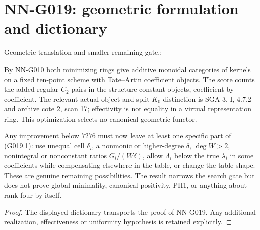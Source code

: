 \section{NN-G019: geometric formulation and dictionary}
\begin{geometricstatement}[NN-G019]
Geometric translation and smaller remaining gate.:

By NN-G010 both minimizing rings give additive monoidal
categories of kernels on a fixed ten-point scheme with
Tate--Artin coefficient objects. The score counts the added
regular $C_2$ pairs in the structure-constant objects,
coefficient by coefficient. The relevant actual-object and
split-$K_0$ distinction is SGA 3, I, 4.7.2 and archive cote 2,
scan 17; effectivity is not equality in a virtual representation
ring. This optimization selects no canonical geometric functor.

Any improvement below $7276$ must now leave at least one
specific part of (G019.1): use unequal cell $\delta_i$,
a nonmonic or higher-degree $\delta$, $\deg W>2$,
nonintegral or nonconstant ratios $G_i/(W\delta)$,
allow $\Lambda_i$ below the true $\lambda_i$ in some
coefficients while compensating elsewhere in the table,
or change the table shape. These are genuine remaining
possibilities. The result narrows the search gate but
does not prove global minimality, canonical positivity,
PH1, or anything about rank four by itself.


\end{geometricstatement}
\begin{proof} The displayed dictionary transports the proof of NN-G019. Any additional realization, effectiveness or uniformity hypothesis is retained explicitly.\end{proof}


